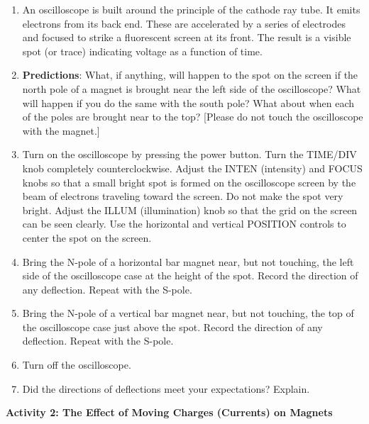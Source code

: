\begin{enumerate}
\item An oscilloscope is built around the principle of the cathode ray tube. It emits electrons from its back end. These are accelerated by a series of electrodes and focused to strike a fluorescent screen at its front. The result is a visible spot (or trace) indicating voltage as a function of time.

\item \textbf{Predictions}: What, if anything, will happen to the spot on
the screen if the north pole of a magnet is brought near the left
side of the oscilloscope? What will happen if you do the same with
the south pole? What about when each of the poles are brought near
to the top? {[}Please do not touch the oscilloscope with the magnet.{]} 
\vspace{30mm}

\item Turn on the oscilloscope by pressing the power button. Turn the TIME/DIV 
knob completely counterclockwise. Adjust the INTEN (intensity) and FOCUS knobs 
so that a small bright spot is formed on the oscilloscope screen by the beam of 
electrons traveling toward the screen. Do not make the spot very bright. 
Adjust the ILLUM (illumination) knob so that the grid on the screen can be seen 
clearly. Use the horizontal and vertical POSITION controls to center the spot 
on the screen.

\item Bring the N-pole of a horizontal bar magnet near, but not touching,
the left side of the oscilloscope case at the height of the spot.
Record the direction of any deflection. Repeat with the S-pole.\vspace{20mm}

\item Bring the N-pole of a vertical bar magnet near, but not touching,
the top of the oscilloscope case just above the spot. Record the direction
of any deflection. Repeat with the S-pole.\vspace{25mm}

\item Turn off the oscilloscope.
\item Did the directions of deflections meet your expectations? Explain. 
\vspace{25mm}

\end{enumerate}

\textbf{Activity 2: The Effect of Moving Charges (Currents) on Magnets}


